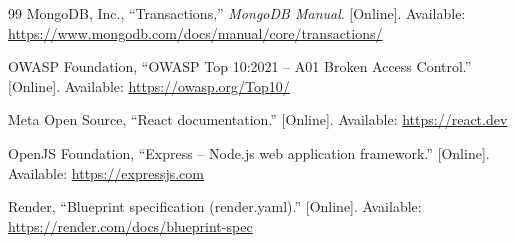 \begin{thebibliography}{99}
 MongoDB, Inc., ``Transactions,'' \emph{MongoDB Manual}. [Online]. Available: \url{https://www.mongodb.com/docs/manual/core/transactions/}

 OWASP Foundation, ``OWASP Top 10:2021 -- A01 Broken Access Control.'' [Online]. Available: \url{https://owasp.org/Top10/}

 Meta Open Source, ``React documentation.'' [Online]. Available: \url{https://react.dev}

 OpenJS Foundation, ``Express -- Node.js web application framework.'' [Online]. Available: \url{https://expressjs.com}

 Render, ``Blueprint specification (render.yaml).'' [Online]. Available: \url{https://render.com/docs/blueprint-spec}

\end{thebibliography}
